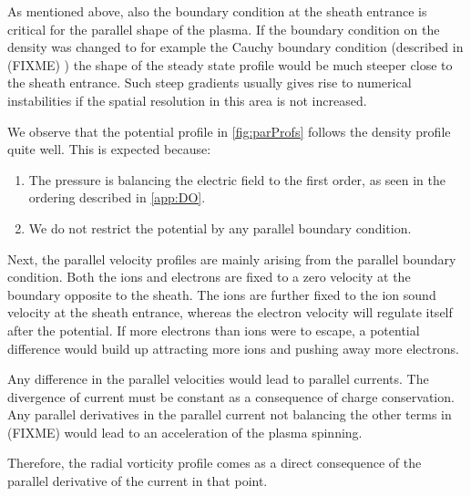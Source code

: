 As mentioned above, also the boundary condition at the sheath entrance is critical for the parallel shape of the plasma.
If the boundary condition on the density was changed to for example the Cauchy boundary condition (described in
(FIXME)
)
the shape of the steady state profile would be much steeper close to the sheath entrance.
Such steep gradients usually gives rise to numerical instabilities if the spatial resolution in this area is not increased.

We observe that the potential profile in \cref{fig:parProfs} follows the density profile quite well.
This is expected because:
%
\begin{enumerate}[noitemsep]
        \item The pressure is balancing the electric field to the first order, as seen in the ordering described in \ref{app:DO}.
        \item We do not restrict the potential by any parallel boundary condition.
\end{enumerate}

Next, the parallel velocity profiles are mainly arising from the parallel boundary condition.
Both the ions and electrons are fixed to a zero velocity at the boundary opposite to the sheath.
The ions are further fixed to the ion sound velocity at the sheath entrance, whereas the electron velocity will regulate itself after the potential.
If more electrons than ions were to escape, a potential difference would build up attracting more ions and pushing away more electrons.
%

Any difference in the parallel velocities would lead to parallel currents.
The divergence of current must be constant as a consequence of charge conservation.
Any parallel derivatives in the parallel current not balancing the other terms in (FIXME)
would lead to an acceleration of the plasma spinning.

Therefore, the radial vorticity profile comes as a direct consequence of the parallel derivative of the current in that point.

